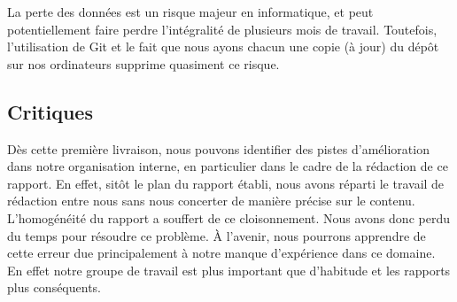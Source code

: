 	    La perte des données est un risque majeur en informatique, et peut potentiellement faire perdre l'intégralité de plusieurs mois de travail. Toutefois, l'utilisation de Git et le fait que nous ayons chacun une copie (à jour) du dépôt sur nos ordinateurs supprime quasiment ce risque.

	\subsection{Critiques}

		Dès cette première livraison, nous pouvons identifier des pistes d'amélioration dans notre organisation interne, en particulier dans le cadre de la rédaction de ce rapport. En effet, sitôt le plan du rapport établi, nous avons réparti le travail de rédaction entre nous sans nous concerter de manière précise sur le contenu. L'homogénéité du rapport a souffert de ce cloisonnement. Nous avons donc perdu du temps pour résoudre ce problème. \`A l'avenir, nous pourrons apprendre de cette erreur due principalement à notre manque d'expérience dans ce domaine. En effet notre groupe de travail est plus important que d'habitude et les rapports plus conséquents.
